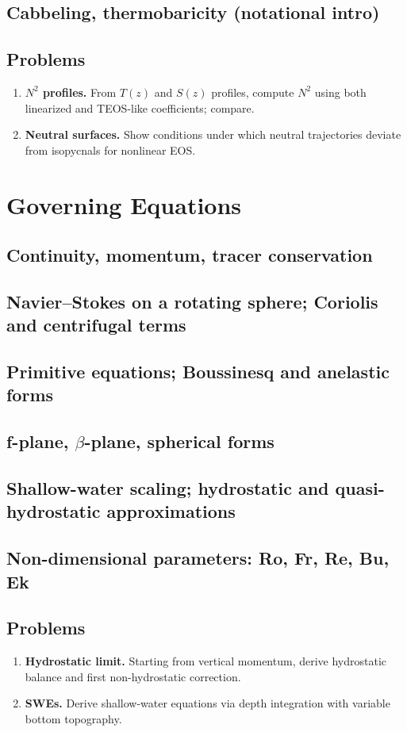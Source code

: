 \documentclass[12pt]{book}
\begin{document}
\section{Cabbeling, thermobaricity (notational intro)}
\section*{Problems}
\begin{enumerate}
  \item \textbf{$N^2$ profiles.} From $T(z)$ and $S(z)$ profiles, compute $N^2$ using both linearized and TEOS-like coefficients; compare.
  \item \textbf{Neutral surfaces.} Show conditions under which neutral trajectories deviate from isopycnals for nonlinear EOS.
\end{enumerate}

\chapter{Governing Equations}
\section{Continuity, momentum, tracer conservation}
\section{Navier--Stokes on a rotating sphere; Coriolis and centrifugal terms}
\section{Primitive equations; Boussinesq and anelastic forms}
\section{f-plane, $\beta$-plane, spherical forms}
\section{Shallow-water scaling; hydrostatic and quasi-hydrostatic approximations}
\section{Non-dimensional parameters: Ro, Fr, Re, Bu, Ek}
\section*{Problems}
\begin{enumerate}
  \item \textbf{Hydrostatic limit.} Starting from vertical momentum, derive hydrostatic balance and first non-hydrostatic correction.
  \item \textbf{SWEs.} Derive shallow-water equations via depth integration with variable bottom topography.
\end{enumerate}
\end{document}
